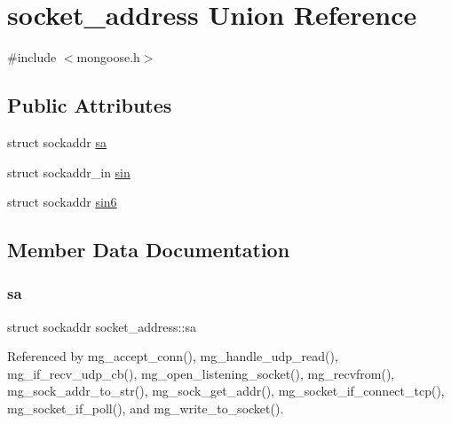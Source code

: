 \hypertarget{unionsocket__address}{}\section{socket\+\_\+address Union Reference}
\label{unionsocket__address}


{\ttfamily \#include $<$mongoose.\+h$>$}

\subsection*{Public Attributes}
\begin{DoxyCompactItemize}
\item 
struct sockaddr \hyperlink{unionsocket__address_ab6a9b0bc545e839df7e06e5b6bff0891_ab6a9b0bc545e839df7e06e5b6bff0891}{sa}
\item 
struct sockaddr\+\_\+in \hyperlink{unionsocket__address_af540a7224ea459c48bc6ec1ca592e55d_af540a7224ea459c48bc6ec1ca592e55d}{sin}
\item 
struct sockaddr \hyperlink{unionsocket__address_a923a2caba3cad046553b3632f7c2c571_a923a2caba3cad046553b3632f7c2c571}{sin6}
\end{DoxyCompactItemize}


\subsection{Member Data Documentation}
\mbox{\label{unionsocket__address_ab6a9b0bc545e839df7e06e5b6bff0891_ab6a9b0bc545e839df7e06e5b6bff0891}} 
\subsubsection{\texorpdfstring{sa}{sa}}
{\footnotesize\ttfamily struct sockaddr socket\+\_\+address\+::sa}



Referenced by mg\+\_\+accept\+\_\+conn(), mg\+\_\+handle\+\_\+udp\+\_\+read(), mg\+\_\+if\+\_\+recv\+\_\+udp\+\_\+cb(), mg\+\_\+open\+\_\+listening\+\_\+socket(), mg\+\_\+recvfrom(), mg\+\_\+sock\+\_\+addr\+\_\+to\+\_\+str(), mg\+\_\+sock\+\_\+get\+\_\+addr(), mg\+\_\+socket\+\_\+if\+\_\+connect\+\_\+tcp(), mg\+\_\+socket\+\_\+if\+\_\+poll(), and mg\+\_\+write\+\_\+to\+\_\+socket().

